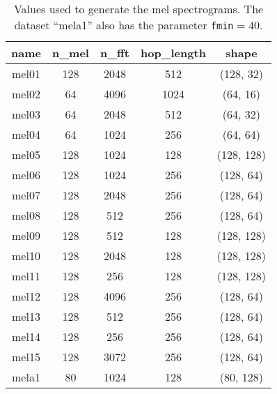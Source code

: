 \begin{table}[h!]
    \centering
    \caption{
    Values used to generate the mel spectrograms. The dataset ``mela1'' also
has the parameter \texttt{fmin}$=40$.}
    \label{tab:mel_values}
    \begin{tabular}{|c|cccc|}
        \hline
        name & n\_mel & n\_fft & hop\_length & shape \\
        \hline
        mel01 & 128 & 2048 & 512   & (128, 32) \\
        mel02 & 64  & 4096 & 1024  & (64, 16) \\
        mel03 & 64  & 2048 & 512   & (64, 32) \\
        mel04 & 64  & 1024 & 256   & (64, 64) \\
        mel05 & 128 & 1024 & 128   & (128, 128) \\
        mel06 & 128 & 1024 & 256   & (128, 64) \\
        mel07 & 128 & 2048 & 256   & (128, 64) \\
        mel08 & 128 & 512  & 256   & (128, 64) \\
        mel09 & 128 & 512  & 128   & (128, 128) \\
        mel10 & 128 & 2048 & 128   & (128, 128) \\
        mel11 & 128 & 256  & 128   & (128, 128) \\
        mel12 & 128 & 4096 & 256   & (128, 64) \\
        mel13 & 128 & 512  & 256   & (128, 64) \\
        mel14 & 128 & 256  & 256   & (128, 64) \\
        mel15 & 128 & 3072 & 256   & (128, 64) \\
        mela1 & 80  & 1024 & 128   & (80, 128) \\
        \hline
    \end{tabular}
\end{table}

